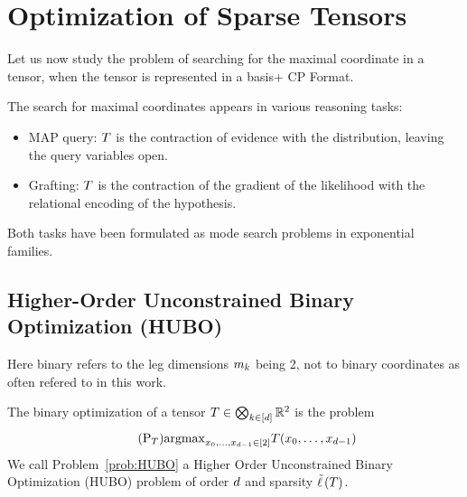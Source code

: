 
\section{Optimization of Sparse Tensors}

Let us now study the problem of searching for the maximal coordinate in a tensor, when the tensor is represented in a basis+ CP Format. 


The search for maximal coordinates appears in various reasoning tasks:
\begin{itemize}
	\item MAP query: $T$ is the contraction of evidence with the distribution, leaving the query variables open.
	\item Grafting: $T$ is the contraction of the gradient of the likelihood with the relational encoding of the hypothesis.
\end{itemize}
Both tasks have been formulated as mode search problems in exponential families.









\subsection{Higher-Order Unconstrained Binary Optimization (HUBO)}

Here binary refers to the leg dimensions $m_{k}$ being 2, not to binary coordinates as often refered to in this work.

\begin{definition}
	The binary optimization of a tensor $T\in\bigotimes_{k\in[d]}\mathbb{R}^2$ is the problem
	\begin{align}\tag{$\mathrm{P}_{\hypercore}$}\label{prob:HUBO}
		\argmax_{\atomindices\in[2]} \hypercore(\atomindices) %
	\end{align}
	We call Problem~\ref{prob:HUBO} a Higher Order Unconstrained Binary Optimization (HUBO) problem of order $d$ and sparsity $\tilde{\ell} \left(T\right)$.
\end{definition}


